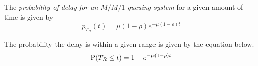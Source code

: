\begin{definition}\label{def:MM1_Prob_Delay}
  The \emph{probability of delay for an $M/M/1$ queuing system} for a given amount of time is given by
  \begin{equation}\label{eq:MM1_Delay}
    p_{T_{R}}(t) = \mu (1-\rho) e^{-\mu (1-\rho) t}
  \end{equation}

  The probability the delay is within a given range is given by the equation below.
  \begin{equation}
    \label{eq:9}
    \operatorname{\operatorname{P}}(T_{R} \leq t) = 1 - e^{-\mu (1-\rho) t}
  \end{equation}
\end{definition}

